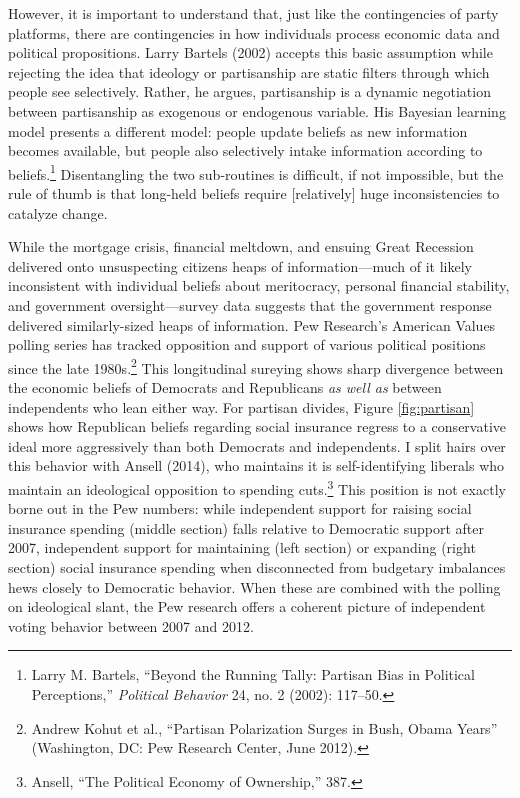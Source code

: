 \documentclass[12pt,oneside]{psthesis}
\begin{document}
However, it is important to understand that, just like the contingencies of party platforms, there are contingencies in how individuals process economic data and political propositions.
Larry Bartels (2002) accepts this basic assumption while rejecting the idea that ideology or partisanship are static filters through which people see selectively.
Rather, he argues, partisanship is a dynamic negotiation between partisanship as exogenous or endogenous variable.
His Bayesian learning model presents a different model: people update beliefs as new information becomes available, but people also selectively intake information according to beliefs.\footnote{Larry M. Bartels, ``Beyond the Running Tally: Partisan Bias in Political Perceptions,'' \emph{Political Behavior} 24, no. 2 (2002): 117--50.}
Disentangling the two sub-routines is difficult, if not impossible, but the rule of thumb is that long-held beliefs require {[}relatively{]} huge inconsistencies to catalyze change.

While the mortgage crisis, financial meltdown, and ensuing Great Recession delivered onto unsuspecting citizens heaps of information---much of it likely inconsistent with individual beliefs about meritocracy, personal financial stability, and government oversight---survey data suggests that the government response delivered similarly-sized heaps of information.
Pew Research's American Values polling series has tracked opposition and support of various political positions since the late 1980s.\footnote{Andrew Kohut et al., ``Partisan Polarization Surges in Bush, Obama Years'' (Washington, DC: Pew Research Center, June 2012).}
This longitudinal sureying shows sharp divergence between the economic beliefs of Democrats and Republicans \emph{as well as} between independents who lean either way.
For partisan divides, Figure \ref{fig:partisan} shows how Republican beliefs regarding social insurance regress to a conservative ideal more aggressively than both Democrats and independents.
I split hairs over this behavior with Ansell (2014), who maintains it is self-identifying liberals who maintain an ideological opposition to spending cuts.\footnote{Ansell, ``The Political Economy of Ownership,'' 387.}
This position is not exactly borne out in the Pew numbers: while independent support for raising social insurance spending (middle section) falls relative to Democratic support after 2007, independent support for maintaining (left section) or expanding (right section) social insurance spending when disconnected from budgetary imbalances hews closely to Democratic behavior.
When these are combined with the polling on ideological slant, the Pew research offers a coherent picture of independent voting behavior between 2007 and 2012.
\end{document}
